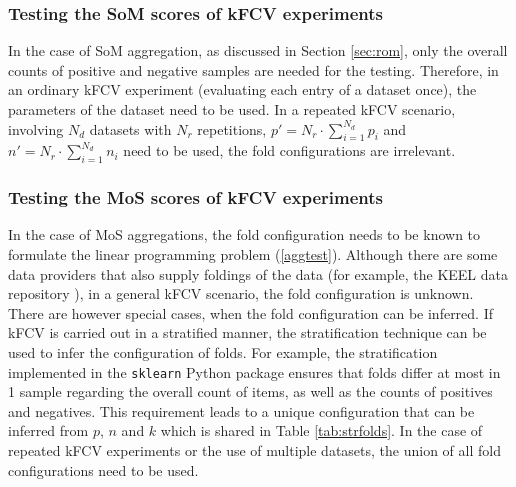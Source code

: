 \documentclass[5p, final]{elsarticle}
\begin{document}
\subsubsection{Testing the SoM scores of kFCV experiments}
\label{sec:somkfcv}

In the case of SoM aggregation, as discussed in Section \ref{sec:rom}, only the overall counts of positive and negative samples are needed for the testing. Therefore, in an ordinary kFCV experiment (evaluating each entry of a dataset once), the parameters of the dataset need to be used. In a repeated kFCV scenario, involving $N_d$ datasets with $N_r$ repetitions, $p'=N_r\cdot \sum\limits_{i=1}^{N_d} p_i$ and $n'=N_r\cdot \sum\limits_{i=1}^{N_d} n_i$ need to be used, the fold configurations are irrelevant.

\subsubsection{Testing the MoS scores of kFCV experiments}
\label{sec:moskfcv}

In the case of MoS aggregations, the fold configuration needs to be known to formulate the linear programming problem (\ref{aggtest}). Although there are some data providers that also supply foldings of the data (for example, the KEEL data repository \cite{keel}), in a general kFCV scenario, the fold configuration is unknown. There are however special cases, when the fold configuration can be inferred. If kFCV is carried out in a stratified manner, the stratification technique can be used to infer the configuration of folds. For example, the stratification implemented in the \verb|sklearn| \cite{sklearn} Python package ensures that folds differ at most in 1 sample regarding the overall count of items, as well as the counts of positives and negatives. This requirement leads to a unique configuration that can be inferred from $p$, $n$ and $k$ which is shared in Table \ref{tab:strfolds}. In the case of repeated kFCV experiments or the use of multiple datasets, the union of all fold configurations need to be used.
\end{document}

